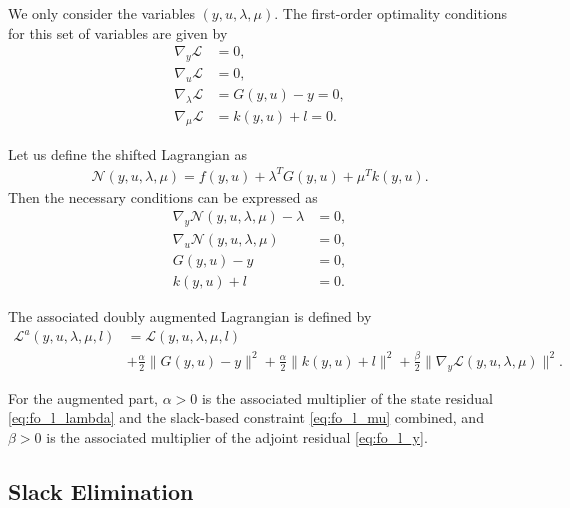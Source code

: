 \documentclass[11pt]{article}
\newcommand{\Lag}{\mathcal L}
\newcommand{\DLag}{\mathcal L^a}
\begin{document}
We only consider the variables $ (y,u,\lambda,\mu)$. The first-order optimality conditions for this set of variables are given by 
\begin{subequations}\label{eq:fo_l}
\begin{align}
\nabla_y \Lag &= 0, \label{eq:fo_l_y}\\
\nabla_u \Lag &= 0, \label{eq:fo_l_u}\\
\nabla_\lambda \Lag &= G(y,u)-y = 0, \label{eq:fo_l_lambda}\\
\nabla_\mu \Lag &= k(y,u)+l = 0. \label{eq:fo_l_mu}
\end{align}
\end{subequations}

Let us define the shifted Lagrangian as
\begin{align*}
    \mathcal{N}(y,u,\lambda, \mu) = f(y,u)+\lambda ^T G(y,u)+\mu^Tk(y,u).
\end{align*}
Then the necessary conditions can be expressed as
\begin{subequations}\label{eq:fo_shifted}
\begin{align}
\nabla_y \mathcal{N}(y,u,\lambda,\mu) - \lambda &= 0, \label{eq:fo_shifted_y}\\
\nabla_u \mathcal{N}(y,u,\lambda,\mu) &= 0, \label{eq:fo_shifted_u}\\
G(y,u) - y &= 0, \label{eq:fo_shifted_state}\\
k(y,u) + l &= 0. \label{eq:fo_shifted_ineq}
\end{align}
\end{subequations}

The associated doubly augmented Lagrangian is defined by
\begin{align}
\label{eq:dal}
\DLag(y,u,\lambda,\mu,l)
&=
\Lag(y,u,\lambda,\mu,l)\\
&+
\frac{\alpha}{2}\|G(y,u)-y\|^2 +
\frac{\alpha}{2}\|k(y,u)+l\|^2 +
\frac{\beta}{2}
\|
\nabla_y\Lag(y,u,\lambda,\mu)
\|^2. \nonumber
\end{align}

For the augmented part, $\alpha >0$ is the associated multiplier of the state residual \eqref{eq:fo_l_lambda} and the slack-based constraint \eqref{eq:fo_l_mu} combined, and $\beta >0$ is the associated multiplier of the adjoint residual \eqref{eq:fo_l_y}. 

\subsection{Slack Elimination}
\end{document}
